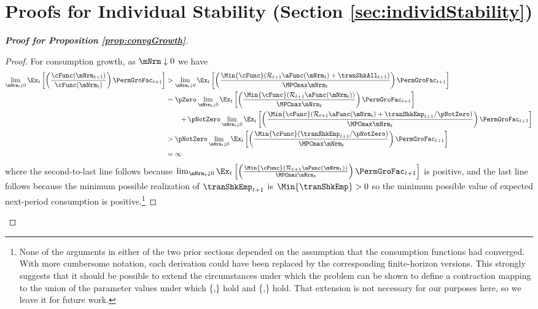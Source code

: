 \documentclass[\econtexRoot/BufferStockTheory]{subfiles}
\begin{document}

\hypertarget{ApndxMTargetIsStable}{}
\section{Proofs for Individual Stability (Section \ref{sec:individStability})}\label{sec:ApndxMTargetIsStable}

\begin{proof}[\textbf{Proof for Proposition \ref{prop:convgGrowth}}]

\begin{proof}
For consumption growth, as $\mNrm \downarrow 0$ we have
\begin{align*}
  \lim_{\mNrm_{t} \downarrow 0} \Ex_{t}\left[\left(\frac{\cFunc({\mNrm}_{t+1})}{\cFunc(\mNrm_t)}\right){\PermGroFac}_{t+1}\right]
  & > \lim_{\mNrm_{t} \downarrow 0} \Ex_{t}\left[\left(\frac{\Min{\cFunc}({\mathcal{\mathcal{R}}}_{t+1}\aFunc(\mNrm_{t})+{%
    \tranShkAll}_{t+1})}{\MPCmax \mNrm_{t}}\right){\PermGroFac}_{t+1}\right]  \notag \\
  & = \pZero \lim_{\mNrm_{t} \downarrow 0} \Ex_{t}\left[\left(\frac{\Min{\cFunc}({\mathcal{\mathcal{R}}}_{t+1}\aFunc(\mNrm_{t}))}{\MPCmax \mNrm_{t}}\right){\PermGroFac}_{t+1}\right] \\
  & ~~~~~~ + \pNotZero \lim_{\mNrm_{t} \downarrow 0}  \Ex_{t}\left[\left(\frac{\Min{\cFunc}({\mathcal{\mathcal{R}}}_{t+1}\aFunc(\mNrm_{t})+
    \tranShkEmp_{t+1}/\pNotZero)}{\MPCmax \mNrm_{t}}\right){\PermGroFac}_{t+1}\right]  \\\notag
  & > \pNotZero \lim_{\mNrm_{t} \downarrow 0} \Ex_{t}\left[\left(\frac{\Min{\cFunc}(
    \tranShkEmp_{t+1}/\pNotZero)}{\MPCmax \mNrm_{t}}\right){\PermGroFac}_{t+1}\right] \\
  & = \infty \nonumber
\end{align*}
where the second-to-last line follows because  $\lim_{\mNrm_{t} \downarrow 0} \Ex_{t}\left[\left(\frac{\Min{\cFunc}({\mathcal{\mathcal{R}}}_{t+1}\aFunc(\mNrm_{t}))}{\MPCmax \mNrm_{t}}\right){\PermGroFac}_{t+1}\right]$ is positive, and the last line follows because the minimum possible realization of $\tranShkEmp_{t+1}$ is $\Min{\tranShkEmp}>0$ so the minimum possible value of expected next-period consumption is positive.\footnote{None of the arguments in either of the two prior sections depended on the assumption that the consumption functions had converged.  With more cumbersome notation, each derivation could have been replaced by the corresponding finite-horizon versions.  This strongly suggests that it should be possible to extend the circumstances under which the problem can be shown to define a contraction mapping to the union of the parameter values under which \{\RIC,\FHWC\} hold and \{\FVAC,\WRIC\} hold.  That extension is not necessary for our purposes here, so we leave it for future work.}


\end{proof}
\end{proof}
\end{document}
